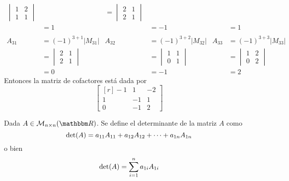 \begin{example}
\begin{align*}
\begin{vmatrix}
            1 & 2 \\
            1 & 1
        \end{vmatrix} & & = \begin{vmatrix}
            2 & 1 \\
            2 & 1
        \end{vmatrix} \\
        & = 1 & & = -1 & & = 1 \\
        & \\
        A_{31} & = (-1)^{3+1} |M_{31}| & A_{32} & = (-1)^{3+2} |M_{32}| & A_{33} & = (-1)^{3+3} |M_{33}| \\
        & = \begin{vmatrix}
            2 & 1 \\
            2 & 1
        \end{vmatrix} & & = \begin{vmatrix}
            1 & 1 \\
            0 & 1
        \end{vmatrix} & & = \begin{vmatrix}
            1 & 2 \\
            0 & 2
        \end{vmatrix} \\
        & = 0 & & = -1 & & = 2
    \end{align*}
    Entonces la matriz de cofactores está dada por
    $$\begin{bmatrix*}[r]
        -1 & 1 & -2 \\
        1 & -1 & 1 \\
        0 & -1 & 2
    \end{bmatrix*}$$
\end{example}

\begin{definition}
    Dada $A \in \mathcal{M}_{n \times n}(\RR)$. Se define el determinante de la matriz $A$ como
    $$\operatorname{det}(A) = a_{11}A_{11} + a_{12}A_{12} + \cdots + a_{1n}A_{1n}$$
    o bien
    $$\operatorname{det}(A) = \sum_{i=1}^n a_{1i}A_{1i}$$
\end{definition}

